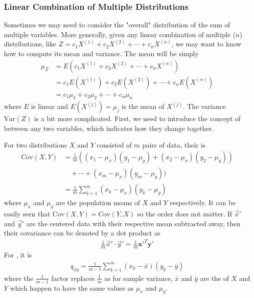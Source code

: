 \subsubsection{Linear Combination of Multiple Distributions}
Sometimes we may need to consider the "overall" distribution of the sum of multiple variables. More generally, given any linear combination of multiple ($n$) distributions, like $Z = c_1X^{(1)} + c_2X^{(2)} + \cdots + c_nX^{(n)}$, we may want to know how to compute its mean and variance. The mean will be simply 
\begin{align}
\mu_Z &= E(c_1X^{(1)} + c_2X^{(2)} + \cdots + c_nX^{(n)}) \nonumber \\
&= c_1E(X^{(1)}) + c_2E(X^{(2)}) + \cdots + c_nE(X^{(n)}) \nonumber \\
&= c_1\mu_1 + c_2\mu_2 + \cdots + c_n\mu_n     
\end{align}
where $E$ is linear and $E(X^{(j)}) = \mu_j$ is the mean of $X^{(j)}$. The variance $\text{Var}(Z)$ is a bit more complicated. First, we need to introduce the concept of  between any two variables, which indicates how they change together.
\begin{defn}
\label{defn:covariance}
For two distributions $X$ and $Y$ consisted of $m$ pairs of data, their  is
\begin{align}
\text{Cov}(X,Y) &= \frac{1}{m}((x_1-\mu_x)(y_1-\mu_y) + (x_2-\mu_x)(y_2-\mu_y)) \nonumber \\
&\quad + \cdots + (x_m-\mu_x)(y_m-\mu_y)) \nonumber \\
&= \frac{1}{m}\sum_{k=1}^{m} (x_k-\mu_x)(y_k-\mu_y) \label{eqn:covsumprod}
\end{align}
where $\mu_x$ and $\mu_y$ are the population means of $X$ and $Y$ respectively. It can be easily seen that $\text{Cov}(X,Y) = \text{Cov}(Y,X)$ so the order does not matter. If $\vec{x}'$ and $\vec{y}'$ are the centered data with their respective mean subtracted away, then their covariance can be denoted by a dot product as
\begin{align}
\frac{1}{m} \vec{x}' \cdot \vec{y}' = \frac{1}{m} \textbf{x}'^T \textbf{y}' \label{eqn:covdot}
\end{align}
For , it is
\begin{align}
q_{xy} = \frac{1}{m-1} \sum_{k=1}^{m} (x_k-\bar{x})(y_k-\bar{y})
\end{align}
where the $\frac{1}{m-1}$ factor replaces $\frac{1}{m}$ as for sample variance, $\bar{x}$ and $\bar{y}$ are the  of $X$ and $Y$ which happen to have the same values as $\mu_x$ and $\mu_y$.
\end{defn}

